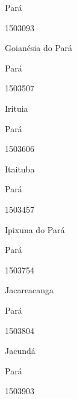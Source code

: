 \documentclass[
  letterpaper,
]{report}
\begin{document}
\n      

Pará

\n      

1503093

\n      

Goianésia do Pará

\n    

\n    

\n      

Pará

\n      

1503507

\n      

Irituia

\n    

\n    

\n      

Pará

\n      

1503606

\n      

Itaituba

\n    

\n    

\n      

Pará

\n      

1503457

\n      

Ipixuna do Pará

\n    

\n    

\n      

Pará

\n      

1503754

\n      

Jacareacanga

\n    

\n    

\n      

Pará

\n      

1503804

\n      

Jacundá

\n    

\n    

\n      

Pará

\n      

1503903

\n      
\end{document}
